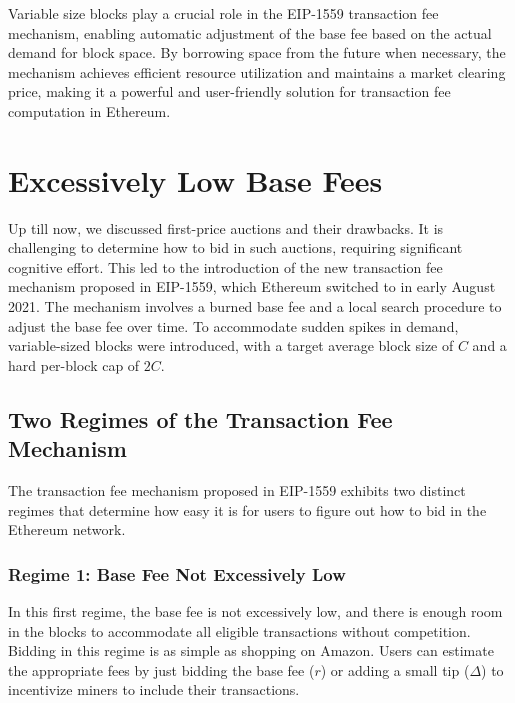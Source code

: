 Variable size blocks play a crucial role in the EIP-1559 transaction fee mechanism, enabling automatic adjustment of the base fee based on the actual demand for block space. By borrowing space from the future when necessary, the mechanism achieves efficient resource utilization and maintains a market clearing price, making it a powerful and user-friendly solution for transaction fee computation in Ethereum.

\section{Excessively Low Base Fees}
Up till now, we discussed first-price auctions and their drawbacks. It is challenging to determine how to bid in such auctions, requiring significant cognitive effort. This led to the introduction of the new transaction fee mechanism proposed in EIP-1559, which Ethereum switched to in early August 2021. The mechanism involves a burned base fee and a local search procedure to adjust the base fee over time. To accommodate sudden spikes in demand, variable-sized blocks were introduced, with a target average block size of $C$ and a hard per-block cap of $2C$.

\subsection{Two Regimes of the Transaction Fee Mechanism}
The transaction fee mechanism proposed in EIP-1559 exhibits two distinct regimes that determine how easy it is for users to figure out how to bid in the Ethereum network.


\subsubsection{Regime 1: Base Fee Not Excessively Low}
In this first regime, the base fee is not excessively low, and there is enough room in the blocks to accommodate all eligible transactions without competition. Bidding in this regime is as simple as shopping on Amazon. Users can estimate the appropriate fees by just bidding the base fee ($r$) or adding a small tip ($\Delta$) to incentivize miners to include their transactions.

